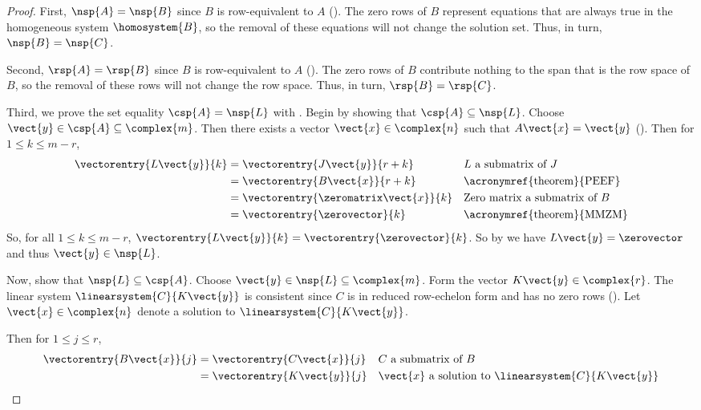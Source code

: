 \begin{proof}
First, $\nsp{A}=\nsp{B}$ since $B$ is row-equivalent to $A$ ().  The zero rows of $B$ represent equations that are always true in the homogeneous system $\homosystem{B}$, so the removal of these equations will not change the solution set.  Thus, in turn, $\nsp{B}=\nsp{C}$.\par
%
Second, $\rsp{A}=\rsp{B}$ since $B$ is row-equivalent to $A$ ().  The zero rows of $B$ contribute nothing to the span that is the row space of $B$, so the removal of these rows will not change the row space.  Thus, in turn, $\rsp{B}=\rsp{C}$.\par
%
Third, we prove the set equality $\csp{A}=\nsp{L}$ with .  Begin by showing that $\csp{A}\subseteq\nsp{L}$.  Choose $\vect{y}\in\csp{A}\subseteq\complex{m}$.  Then there exists a vector $\vect{x}\in\complex{n}$ such that $A\vect{x}=\vect{y}$ ().  Then for $1\leq k\leq m-r$,
%
\begin{align*}
\vectorentry{L\vect{y}}{k}
&=\vectorentry{J\vect{y}}{r+k}
&&\text{$L$ a submatrix of $J$}\\
%
&=\vectorentry{B\vect{x}}{r+k}
&&\text{\acronymref{theorem}{PEEF}}\\
%
&=\vectorentry{\zeromatrix\vect{x}}{k}
&&\text{Zero matrix a submatrix of $B$}\\
%
&=\vectorentry{\zerovector}{k}
&&\text{\acronymref{theorem}{MMZM}}
%
\end{align*}
%
So, for all $1\leq k\leq m-r$, $\vectorentry{L\vect{y}}{k}=\vectorentry{\zerovector}{k}$.  So by  we have $L\vect{y}=\zerovector$ and thus $\vect{y}\in\nsp{L}$.\par
%
Now, show that $\nsp{L}\subseteq\csp{A}$.  Choose $\vect{y}\in\nsp{L}\subseteq\complex{m}$.  Form the vector $K\vect{y}\in\complex{r}$.  The linear system $\linearsystem{C}{K\vect{y}}$ is consistent since $C$ is in reduced row-echelon form and has no zero rows ().  Let $\vect{x}\in\complex{n}$ denote a solution to $\linearsystem{C}{K\vect{y}}$.\par
%
Then for $1\leq j\leq r$,
%
\begin{align*}
\vectorentry{B\vect{x}}{j}
&=\vectorentry{C\vect{x}}{j}
&&\text{$C$ a submatrix of $B$}\\
%
&=\vectorentry{K\vect{y}}{j}
&&\text{$\vect{x}$ a solution to $\linearsystem{C}{K\vect{y}}$}\\
%

\end{align*}
\end{proof}
